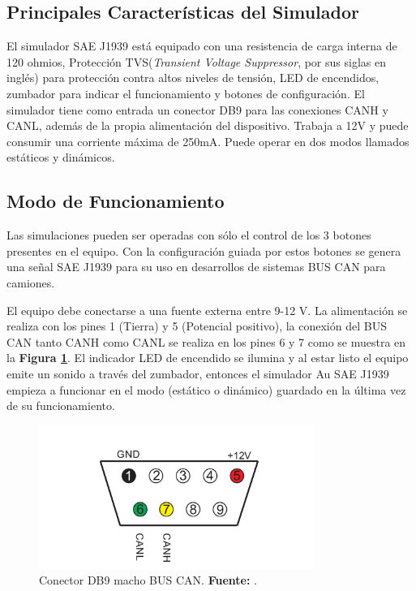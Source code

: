 \subsection {Principales Características del Simulador}
El simulador SAE J1939  está equipado con una resistencia de carga interna de 120 ohmios, Protección TVS(\textit{Transient Voltage Suppressor}, por sus siglas en inglés) para protección contra altos niveles de tensión, LED de encendidos, zumbador para indicar el funcionamiento y botones de configuración. 
El simulador tiene como entrada un conector DB9  para las conexiones CANH y CANL, además de la propia alimentación del dispositivo. 
Trabaja a 12V y puede consumir una corriente máxima de 250mA. 
Puede operar en dos modos llamados estáticos y dinámicos. 


\subsection{Modo de Funcionamiento}

Las simulaciones pueden ser operadas con sólo el control de los 3 botones presentes en el equipo. Con la configuración guiada por estos botones se genera una señal SAE J1939 para su uso en desarrollos de sistemas BUS CAN para camiones.

El equipo debe conectarse a una fuente externa entre 9-12 V. 
La alimentación se realiza con los pines 1 (Tierra) y 5 (Potencial positivo), la conexión del BUS CAN tanto CANH como CANL se realiza en los pines 6 y 7 como se muestra en la \textbf{Figura \ref{DB9}}.  
El indicador LED de encendido se ilumina y al estar listo el equipo emite un sonido a través del zumbador, entonces el simulador Au SAE J1939 empieza a funcionar en el modo (estático o dinámico) guardado en la última vez de su funcionamiento.

\begin{figure}[H]
	\centering
		\includegraphics[width=0.8\textwidth]{./Cap6imagen/SimDb9.pdf}
	\caption[Conector DB9 macho BUS CAN.]{Conector DB9 macho BUS CAN.\textbf{ Fuente:} \cite{UserM}.}
	\label{DB9} %
\end{figure}

